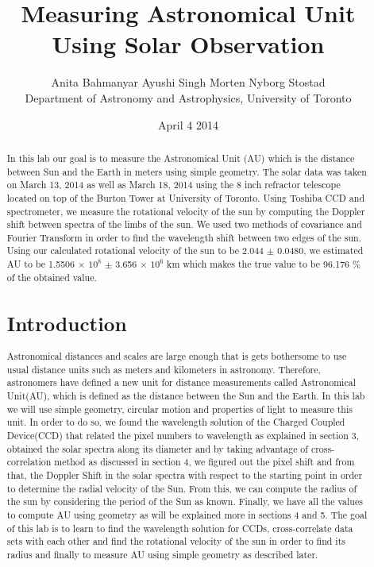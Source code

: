 \documentclass[letterpaper,12pt]{article}
\title{Measuring Astronomical Unit Using Solar Observation}
\author{Anita Bahmanyar \qquad Ayushi Singh \qquad Morten Nyborg Stostad \\Department of Astronomy and Astrophysics, University of Toronto}
\affil{\small {Written by: Anita Bahmanyar}}
\affil{\small {anita.bahmanyar@mail.utoronto.ca}}
\affil{\small {Student Number: 998909098}}
\date{April 4 2014}
\begin{document}
\maketitle

\begin{abstract}
\label{abstract}
In this lab our goal is to measure the Astronomical Unit (AU) which is the distance between Sun and the Earth in meters using simple geometry. The solar data was taken on March 13, 2014 as well as March 18, 2014 using the 8 inch refractor telescope located on top of the Burton Tower at University of Toronto. Using Toshiba CCD and spectrometer, we measure the rotational velocity of the sun by computing the Doppler shift between spectra of the limbs of the sun. We used two methods of covariance and Fourier Transform in order to find the wavelength shift between two edges of the sun. Using our calculated rotational velocity of the sun to be 2.044 $\pm$ 0.0480, we estimated AU to be 1.5506 $\times$ $10^{8}$ $\pm$ 3.656 $\times$ $10^6$ km which makes the true value to be 96.176 \% of the obtained value.

\section{Introduction}
\label{sec:introduction}
Astronomical distances and scales are large enough that is gets bothersome to use usual distance units such as meters and kilometers in astronomy. Therefore, astronomers have defined a new unit for distance measurements called Astronomical Unit(AU), which is defined as the distance between the Sun and the Earth. In this lab we will use simple geometry, circular motion and properties of light to measure this unit. In order to do so, we found the wavelength solution of the Charged Coupled Device(CCD) that related the pixel numbers to wavelength as explained in section 3, obtained the solar spectra along its diameter and by taking advantage of cross-correlation method as discussed in section 4, we figured out the pixel shift and from that, the Doppler Shift in the solar spectra with respect to the starting point in order to determine the radial velocity of the Sun. From this, we can compute the radius of the sun by considering the period of the Sun as known. Finally, we have all the values to compute AU using geometry as will be explained more in sections 4 and 5. The goal of this lab is to learn to find the wavelength solution for CCDs, cross-correlate data sets with each other and find the rotational velocity of the sun in order to find its radius and finally to measure AU using simple geometry as described later.



\end{abstract}
\end{document}
